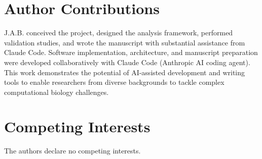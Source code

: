 \documentclass[11pt]{article}
\begin{document}
\section*{Author Contributions}

J.A.B. conceived the project, designed the analysis framework, performed validation studies, and wrote the manuscript with substantial assistance from Claude Code. Software implementation, architecture, and manuscript preparation were developed collaboratively with Claude Code (Anthropic AI coding agent). This work demonstrates the potential of AI-assisted development and writing tools to enable researchers from diverse backgrounds to tackle complex computational biology challenges.

\section*{Competing Interests}

The authors declare no competing interests.
\end{document}
